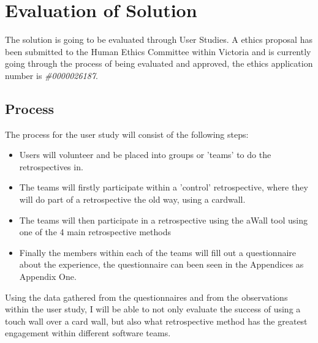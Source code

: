 \chapter{Evaluation of Solution}\label{C:evalution}
The solution is going to be evaluated through User Studies. A ethics proposal has been submitted to the Human Ethics Committee within Victoria and is currently going through the process of being evaluated and approved, the ethics application number is \textit{\#0000026187}. 
\section{Process}
The process for the user study will consist of the following steps:
\begin{itemize}
\item Users will volunteer and be placed into groups or 'teams' to do the retrospectives in.
\item The teams will firstly participate within a 'control' retrospective, where they will do part of a retrospective the old way, using a cardwall.
\item The teams will then participate in a retrospective using the aWall tool using one of the 4 main retrospective methods
\item Finally the members within each of the teams will fill out a questionnaire about the experience, the questionnaire can been seen in the Appendices as Appendix One. 
\end{itemize}

Using the data gathered from the questionnaires and from the observations within the user study, I will be able to not only evaluate the success of using a touch wall over a card wall, but also what retrospective method has the greatest engagement within different software teams. 
